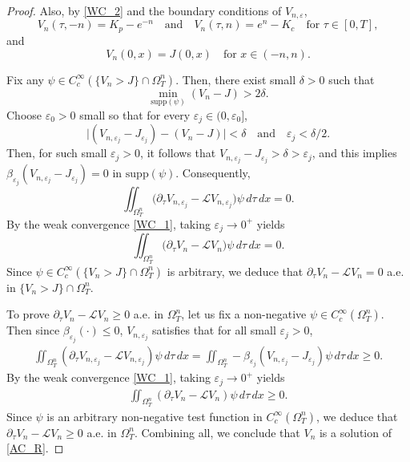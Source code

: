\documentclass[11pt, a4paper, leqno]{amsart}
\numberwithin{equation}{section}
\theoremstyle{plain}
\theoremstyle{definition}
\theoremstyle{remark}
\def\le{\leqslant}
\def\ge{\geqslant}
\def\geq{\geqslant}
\begin{document}
\begin{proof}
{
Also, by \eqref{WC_2} and the boundary conditions of
$V_{n,\varepsilon}$,
\[
    V_n(\tau,-n)=K_p-e^{-n}
    \quad\text{and}\quad
    V_n(\tau,n)=e^n-K_c
    \quad\text{for }\tau\in[0,T],
\]
and
\[
    V_n(0,x)=J(0,x)
    \quad\text{for }x\in(-n,n).
\]
}

Fix any 
$\psi \in C_c^\infty (\{V_n>J\}\cap\Omega^{n}_T)$.
Then, there exist small {$\delta>0$} such that 
\[
  \min\limits_{\text{supp}(\psi)}(V_{n}-J)>2\delta.
\]
Choose $\varepsilon_0>0$ small so that for every
{$\varepsilon_j\in (0,\varepsilon_0]$},
\[
 \vert (V_{n,\varepsilon_j}-J_{\varepsilon_j})-(V_n-J) \vert<\delta
\quad  \text{and} \quad
\varepsilon_j <\delta/2.
\]
Then, for such small $\varepsilon_j>0$, it follows that
$V_{n,\varepsilon_j}-J_{\varepsilon_j}>\delta>\varepsilon_j$,
and this implies
$\beta_{\varepsilon_j}(V_{n,\varepsilon_j}-J_{\varepsilon_j})=0$
in $\text{supp}(\psi)$.
Consequently,
\[
\iint_{\Omega^n_T}
\big(\partial_\tau V_{n,\varepsilon_j}
-\mathcal{L}V_{n,\varepsilon_j}\big)\psi\, d\tau\, dx=0.
\]
By the weak convergence \eqref{WC_1}, taking
$\varepsilon_j\rightarrow0^+$ yields
\[
\iint_{\Omega^n_T}
\big(\partial_\tau V_{n}-\mathcal{L}V_{n}\big)\psi\, d\tau\, dx=0.
\]
Since $\psi\in C_c^\infty (\{V_n>J\}\cap\Omega^{n}_T)$ is arbitrary,
we deduce that
$\partial_\tau V_{n}-\mathcal{L}V_{n}=0$ a.e. in 
$\{V_n>J\}\cap\Omega^{n}_T.$ 

To prove
$\partial_\tau V_n-\mathcal{L}V_n\ge 0$ a.e. in $\Omega^{n}_T$,
let us fix a non-negative $\psi\in C_c^\infty(\Omega^{n}_T)$.
Then since $\beta_{\varepsilon_j}(\cdot)\le 0$,
$V_{n,\varepsilon_j}$ satisfies that for all small $\varepsilon_j>0$,
\begin{align*}
    \iint_{\Omega^{n}_T}
    ({\partial_\tau V_{n,\varepsilon_j}
    -\mathcal{L}V_{n,\varepsilon_j}})\psi \, d\tau \, dx 
    =
    \iint_{\Omega^{n}_T}
    -\beta_{\varepsilon_j}
    (V_{n,\varepsilon_j}-J_{\varepsilon_j})
    \psi \, d\tau \, dx \geq0.
\end{align*}
By the weak convergence \eqref{WC_1}, taking
$\varepsilon_j\rightarrow0^+$ yields
\begin{align*}
    \iint_{\Omega^{n}_T}
    ({\partial_\tau V_{n}-\mathcal{L}V_{n}})\psi
    \, d\tau \, dx
    \geq0.
\end{align*}
Since $\psi$ is an arbitrary non-negative test function in
$C_c^\infty(\Omega_T^n)$, we deduce that
$\partial_\tau V_n-\mathcal{L}V_n\ge 0$ a.e. in $\Omega_T^n$.
Combining all, we conclude that $V_n$ is a solution of \eqref{AC_R}.
\end{proof}
\end{document}
